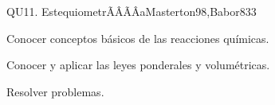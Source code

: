 \begin{sumilla}
\begin{unit}{QU11. EstequiometrÃÂÃÂ­a}{Masterton98,Babor83}{3}
   \begin{objetivos}
      \item Conocer conceptos b\'asicos de las reacciones qu\'imicas.
      \item Conocer y aplicar las leyes ponderales y volum\'etricas.
      \item Resolver problemas.
   \end{objetivos}
\end{unit}

\begin{bibliografia}
\end{bibliografia}
\end{sumilla}


